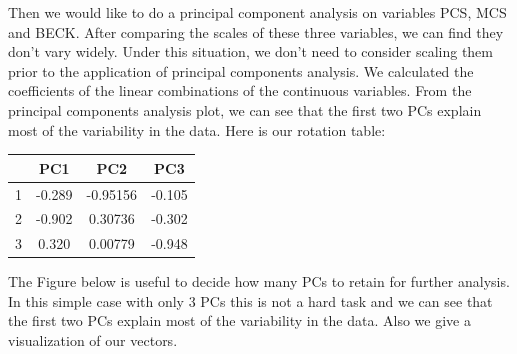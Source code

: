 \documentclass{article}
\begin{document}
      Then we would like to do a principal component analysis on variables PCS, MCS and BECK. After comparing the scales of these three variables, we can find they don't vary widely. Under this situation, we don't need to consider scaling them prior to the application of principal components analysis. We calculated the coefficients of the linear combinations of the continuous variables. From the principal components analysis plot, we can see that the first two PCs explain most of the variability in the data. Here is our rotation table:

      \begin{center}
      \begin{tabular}{c c c c}
        \hline
        & PC1 & PC2 & PC3\\
        \hline
        1 & -0.289 & -0.95156 & -0.105\\
        2 & -0.902 & 0.30736& -0.302\\
        3 & 0.320 & 0.00779 & -0.948\\
        \hline
      \end{tabular}
      \end{center}

      The Figure below is useful to decide how many PCs to retain for further analysis. In this simple case with only 3 PCs this is not a hard task and we can see that the first two PCs explain most of the variability in the data. Also we give a visualization of our vectors.
\end{document}
